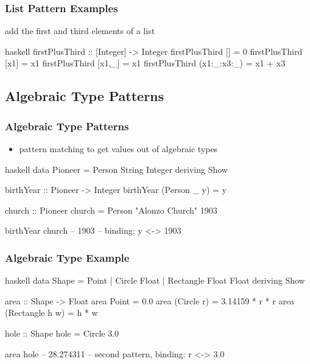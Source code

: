 \documentclass[dvipsnames]{beamer}
\theoremstyle{plain}
\begin{document}
\begin{frame}[fragile]
  \frametitle{List Pattern Examples}

  \begin{exampleblock}{add the first and third elements of a list}
    \begin{pygments}{haskell}
firstPlusThird :: [Integer] -> Integer
firstPlusThird [] = 0
firstPlusThird [x1] = x1
firstPlusThird [x1,_] = x1
firstPlusThird (x1:_:x3:_) = x1 + x3
    \end{pygments}
  \end{exampleblock}
\end{frame}

\subsection{Algebraic Type Patterns}

\begin{frame}[fragile]
  \frametitle{Algebraic Type Patterns}

  \begin{itemize}
    \item pattern matching to get values out of algebraic types
  \end{itemize}

  \begin{exampleblock}{}
    \begin{pygments}{haskell}
data Pioneer = Person String Integer
               deriving Show

birthYear :: Pioneer -> Integer
birthYear (Person _ y) = y

church :: Pioneer
church = Person "Alonzo Church" 1903

birthYear church    -- 1903
-- binding: y <-> 1903
    \end{pygments}
  \end{exampleblock}
\end{frame}

\begin{frame}[fragile]
  \frametitle{Algebraic Type Example}

  \begin{exampleblock}{}
    \begin{pygments}{haskell}
data Shape = Point |
             Circle Float |
             Rectangle Float Float
             deriving Show

area :: Shape -> Float
area Point = 0.0
area (Circle r) = 3.14159 * r * r
area (Rectangle h w) = h * w

hole :: Shape
hole = Circle 3.0

area hole    -- 28.274311
-- second pattern, binding: r <-> 3.0
    \end{pygments}
  \end{exampleblock}
\end{frame}
\end{document}
